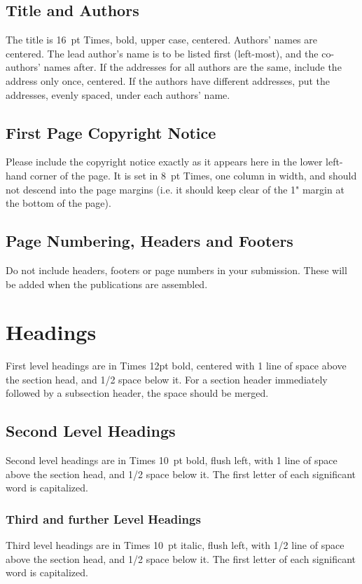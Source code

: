 \documentclass{article}
\begin{document}
\subsection{Title and Authors}
The title is 16~pt Times, bold, upper case, centered. Authors' names are centered. The lead author's name is to be listed first (left-most), and the co-authors' names after. If the addresses for all authors are the same, include the address only once, centered. If the authors have different addresses, put the addresses, evenly spaced, under each authors' name.

\subsection{First Page Copyright Notice}
Please include the copyright notice exactly as it appears here in the lower left-hand corner of the page. It is set in 8~pt Times, one column in width, and should not descend into the  page margins (i.e. it should keep clear of the 1" margin at the bottom of the page).

\subsection{Page Numbering, Headers and Footers}
Do not include headers, footers or page numbers in your submission. These will be added when the publications are assembled.

\section{Headings}
First level headings are in Times 12pt bold, centered with 1 line of space above the section head, and 1/2 space below it.  For a section header immediately followed by a subsection header, the space should be merged.

\subsection{Second Level Headings}
Second level headings are in Times 10~pt bold, flush left,
with 1 line of space above the section head, and 1/2 space below it.
The first letter of each significant word is capitalized.

\subsubsection{Third and further Level Headings}
Third level headings are in Times 10~pt italic, flush left, with 1/2 line of space above the section head, and 1/2 space below it. The first letter of each significant word is capitalized.
\end{document}
